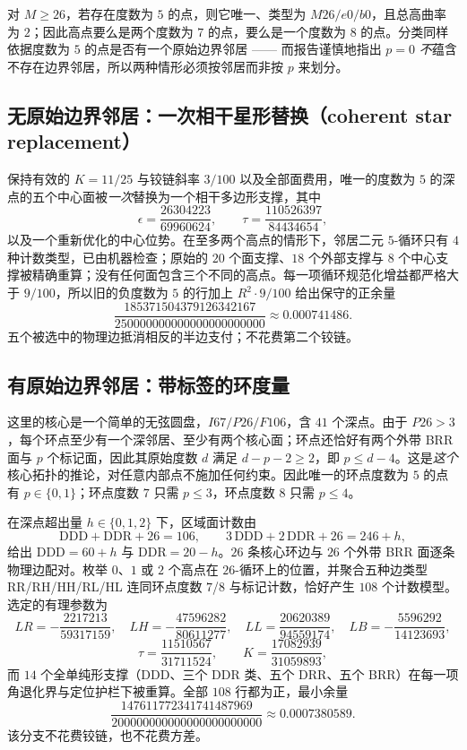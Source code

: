 对 $M\ge26$，若存在度数为 $5$ 的点，则它唯一、类型为 $M26/e0/b0$，且总高曲率为 $2$；因此高点要么是两个度数为 $7$ 的点，要么是一个度数为 $8$ 的点。分类同样依据度数为 $5$ 的点是否有一个原始边界邻居 —— 而报告谨慎地指出 $p=0$ \emph{不}蕴含不存在边界邻居，所以两种情形必须按邻居而非按 $p$ 来划分。

\subsection{无原始边界邻居：一次相干星形替换（coherent star replacement）}

保持有效的 $K=11/25$ 与铰链斜率 $3/100$ 以及全部面费用，唯一的度数为 $5$ 的深点的五个中心面被\emph{一次}替换为一个相干多边形支撑，其中
\[
\epsilon=\frac{26304223}{69960624},\qquad \tau=\frac{110526397}{84434654},
\]
以及一个重新优化的中心位势。在至多两个高点的情形下，邻居二元 $5$-循环只有 $4$ 种计数类型，已由机器检查；原始的 $20$ 个面支撑、$18$ 个外部支撑与 $8$ 个中心支撑被精确重算；没有任何面包含三个不同的高点。每一项循环规范化增益都严格大于 $9/100$，所以旧的负度数为 $5$ 的行加上 $R^2\cdot9/100$ 给出保守的正余量
\[
\frac{185371504379126342167}{250000000000000000000000}\approx0.000741486 .
\]
五个被选中的物理边抵消相反的半边支付；不花费第二个铰链。

\subsection{有原始边界邻居：带标签的环度量}

这里的核心是一个简单的无弦圆盘，$I67/P26/F106$，含 $41$ 个深点。由于 $P26>3$，每个环点至少有一个深邻居、至少有两个核心面；环点还恰好有两个外带 BRR 面与 $p$ 个标记面，因此其原始度数 $d$ 满足 $d-p-2\ge2$，即 $p\le d-4$。这是\emph{这个}核心拓扑的推论，对任意内部点不施加任何约束。因此唯一的环点度数为 $5$ 的点有 $p\in\{0,1\}$；环点度数 $7$ 只需 $p\le3$，环点度数 $8$ 只需 $p\le4$。

在深点超出量 $h\in\{0,1,2\}$ 下，区域面计数由
\[
\mathrm{DDD}+\mathrm{DDR}+26=106,\qquad 3\,\mathrm{DDD}+2\,\mathrm{DDR}+26=246+h,
\]
给出 $\mathrm{DDD}=60+h$ 与 $\mathrm{DDR}=20-h$。$26$ 条核心环边与 $26$ 个外带 BRR 面逐条物理边配对。枚举 $0$、$1$ 或 $2$ 个高点在 $26$-循环上的位置，并聚合五种边类型 RR/RH/HH/RL/HL 连同环点度数 $7$/$8$ 与标记计数，恰好产生 $108$ 个计数模型。选定的有理参数为
\[
LR=-\frac{2217213}{59317159},\quad LH=-\frac{47596282}{80611277},\quad
LL=\frac{20620389}{94559174},\quad LB=-\frac{5596292}{14123693},
\]
\[
\tau=\frac{11510567}{31711524},\qquad K=\frac{17082939}{31059893},
\]
而 $14$ 个全单纯形支撑（DDD、三个 DDR 类、五个 DRR、五个 BRR）在每一项角退化界与定位护栏下被重算。全部 $108$ 行都为正，最小余量
\[
\frac{147611772341741487969}{200000000000000000000000}\approx0.0007380589 .
\]
该分支不花费铰链，也不花费方差。

